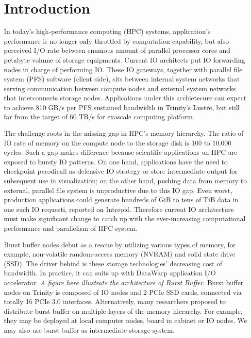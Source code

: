 \section{Introduction}

In today's high-performance computing (HPC) systems, application's performance
is no longer only throttled by computation capability, but also perceived I/O rate between
enumous amount of parallel processor cores and petabyte volume of storage equipments.
Current IO architects put IO forwarding nodes in charge of performing IO.
These IO gateways, together with parallel file system (PFS) software (client side), sits
between internal system networks that serving communication between compute nodes
and external system networks that interconnects storage nodes\cite{Ross:IOSystem}.
Applications under this archietecure can expect to achieve
810 GB/s per PFS sustained bandwidth in Trinity's Lustre\cite{TrinitySystem},
but still far from the target of 60 TB/s for exascale computing platform\cite{Shalf:HPCCS:2010}.

The challenge roots in the missing gap in HPC's memory hierarchy.
The ratio of IO rate of memory on the compute node to the storage disk
is 100 to 10,000 cycles\cite{TrinitySystem}.
Such a gap makes difference because scientific applications on HPC are exposed to
bursty IO patterns\cite{Carns:MSST:2011, Kim:PDSW:2010}.
On one hand, applications have the need to checkpoint perodicall as
defensive IO strategy\cite{Latham:CSD:2012, Naik:ICPPW:2009, Dennis:CUG:2009}
or store intermediate output for subsequent use in visualization;
on the other hand, pushing data from memory to external, parallel file system is
unproductive due to this IO gap.
Even worst, production applications could generate hundreds of GiB to tens of TiB data
in one such IO requesti, reported on Intrepid\cite{Liu:MSST:2012}.
Therefore current IO architecture must make significant change to catch up with
the ever-increasing computational performance and parallelism of HPC system.

Burst buffer nodes debut as a rescue by utilizing various types of memory,
for example, non-volatile random-access memory (NVRAM) and solid state drive (SSD).
The driver behind is these storage technologies' decreasing cost of bandwidth.
In practice, it can suits up with DataWarp application I/O accelerator\cite{DataWarp}.
\textit{A figure here illustrate the architecture of Burst Buffer}.
Burst buffer nodes on Trinity is composed of IO nodes and 2 PCIe SSD cards,
connected via totally 16 PCIe 3.0 interfaces.
Alternatively, many researchers proposed to distribute burst buffer 
on multiple layers of the memory hierarchy\cite{Romanus:CORR:15}.
For example, they may be deployed at local computer nodes, board in cabinet or IO nodes.
We may also use burst buffer as intermediate storage system.

